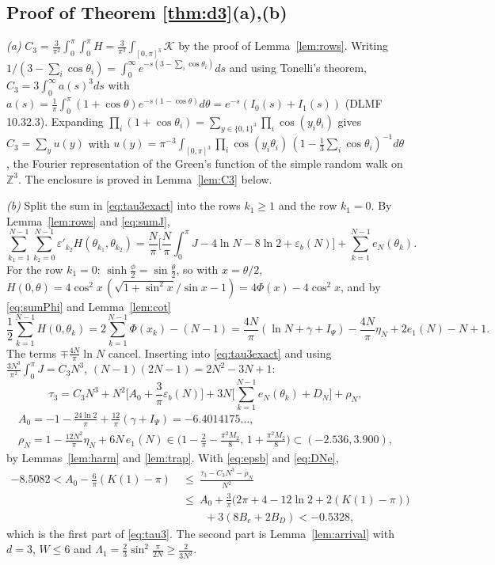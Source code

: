 \documentclass[11pt,a4paper]{article}
\newcommand{\Z}{\mathbb Z}
\theoremstyle{plain}
\theoremstyle{definition}
\numberwithin{equation}{section}
\begin{document}
\subsection{Proof of Theorem \ref{thm:d3}(a),(b)}
\emph{(a)} $C_3=\frac{3}{\pi^2}\int_0^\pi\!\!\int_0^\pi H=\frac3{\pi^3}\int_{[0,\pi]^3}\mathcal K$ by the proof of Lemma~\ref{lem:rows}. Writing $1/(3-\sum_i\cos\theta_i)=\int_0^\infty e^{-s(3-\sum_i\cos\theta_i)}ds$ and using Tonelli's theorem,
$C_3=3\int_0^\infty a(s)^3ds$ with $a(s)=\frac1\pi\int_0^\pi(1+\cos\theta)e^{-s(1-\cos\theta)}d\theta=e^{-s}(I_0(s)+I_1(s))$ (DLMF 10.32.3). Expanding $\prod_i(1+\cos\theta_i)=\sum_{y\in\{0,1\}^3}\prod_i\cos(y_i\theta_i)$ gives $C_3=\sum_yu(y)$ with $u(y)=\pi^{-3}\int_{[0,\pi]^3}\prod_i\cos(y_i\theta_i)\,(1-\frac13\sum_i\cos\theta_i)^{-1}d\theta$, the Fourier representation of the Green's function of the simple random walk on $\Z^3$. The enclosure is proved in Lemma~\ref{lem:C3} below.

\emph{(b)} Split the sum in \eqref{eq:tau3exact} into the rows $k_1\ge1$ and the row $k_1=0$. By Lemma~\ref{lem:rows} and \eqref{eq:sumJ},
\[
\sum_{k_1=1}^{N-1}\sum_{k_2=0}^{N-1}\varepsilon'_{k_2}H(\theta_{k_1},\theta_{k_2})=\frac N\pi\Big[\frac N\pi\int_0^\pi J-4\ln N-8\ln2+\varepsilon_b(N)\Big]+\sum_{k=1}^{N-1}e_N(\theta_k).
\]
For the row $k_1=0$: $\sinh\frac\phi2=\sin\frac{\theta}2$, so with $x=\theta/2$, $H(0,\theta)=4\cos^2x\,(\sqrt{1+\sin^2x}/\sin x-1)=4\Phi(x)-4\cos^2x$, and by \eqref{eq:sumPhi} and Lemma~\ref{lem:cot}
\[
\frac12\sum_{k=1}^{N-1}H(0,\theta_k)=2\sum_{k=1}^{N-1}\Phi(x_k)-(N-1)=\frac{4N}{\pi}(\ln N+\gamma+I_\Psi)-\frac{4N}\pi\eta_N+2e_1(N)-N+1 .
\]
The terms $\mp\frac{4N}{\pi}\ln N$ cancel. Inserting into \eqref{eq:tau3exact} and using $\frac{3N^3}{\pi^2}\int_0^\pi J=C_3N^3$, $(N-1)(2N-1)=2N^2-3N+1$:
\begin{equation}\label{eq:tau3identity}
\tau_3=C_3N^3+N^2\Big[A_0+\frac3\pi\varepsilon_b(N)\Big]+3N\Big[\sum_{k=1}^{N-1}e_N(\theta_k)+D_N\Big]+\rho_N,
\end{equation}
\[
\begin{gathered}A_0=-1-\frac{24\ln2}{\pi}+\frac{12}\pi(\gamma+I_\Psi)=-6.4014175\ldots,\\
\rho_N=1-\frac{12N^2}{\pi}\eta_N+6N\,e_1(N)\in\Big(1-\frac2\pi-\frac{\pi^2M_2}{8},\,1+\frac{\pi^2M_2}{8}\Big)\subset(-2.536,3.900),\end{gathered}
\]
by Lemmas~\ref{lem:harm} and \ref{lem:trap}. With \eqref{eq:epsb} and \eqref{eq:DNe},
\[
\begin{aligned}-8.5082<A_0-\frac6\pi(K(1)-\pi)\ &\le\ \frac{\tau_3-C_3N^3-\rho_N}{N^2}\\ &\le\ A_0+\tfrac3\pi\big(2\pi+4-12\ln2+2(K(1)-\pi)\big)\\ &\qquad+3(8B_e+2B_D)<-0.5328 ,\end{aligned}
\]
which is the first part of \eqref{eq:tau3}. The second part is Lemma~\ref{lem:arrival} with $d=3$, $W\le6$ and $\Lambda_1=\frac23\sin^2\frac{\pi}{2N}\ge\frac{2}{3N^2}$.
\end{document}
